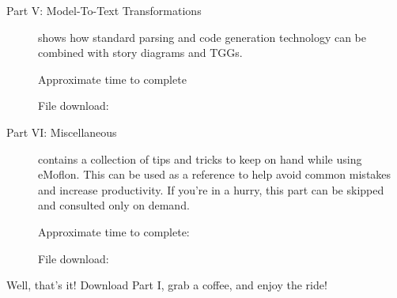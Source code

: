 \begin{description}
\vspace{0.5cm}
\item[Part V: Model-To-Text Transformations] shows how standard parsing and code generation technology can be combined with story diagrams and TGGs.

{\small Approximate time to complete \timeFive
 
File download: \dlPartFive}

\vspace{0.5cm}
\item[Part VI: Miscellaneous] contains a collection of tips and tricks to keep on hand while using eMoflon. This can be used as a reference to help avoid common
mistakes and increase productivity. If you're in a hurry, this part can be skipped and consulted only on demand.

{\small Approximate time to complete: \timeSix
 
File download: \dlPartSix}

\end{description}

Well, that's it! Download Part I, grab a coffee, and enjoy the ride!
